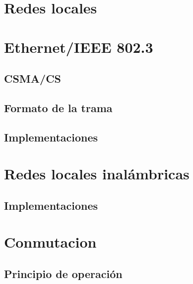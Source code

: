 \documentclass[
]{book}
\begin{document}
\hypertarget{redes-locales-1}{%
\section{Redes locales}\label{redes-locales-1}}

\hypertarget{ethernetieee-802.3}{%
\section{Ethernet/IEEE 802.3}\label{ethernetieee-802.3}}

\hypertarget{csmacs}{%
\subsection{CSMA/CS}\label{csmacs}}

\hypertarget{formato-de-la-trama}{%
\subsection{Formato de la trama}\label{formato-de-la-trama}}

\hypertarget{implementaciones}{%
\subsection{Implementaciones}\label{implementaciones}}

\hypertarget{redes-locales-inaluxe1mbricas}{%
\section{Redes locales inalámbricas}\label{redes-locales-inaluxe1mbricas}}

\hypertarget{implementaciones-1}{%
\subsection{Implementaciones}\label{implementaciones-1}}

\hypertarget{conmutacion}{%
\section{Conmutacion}\label{conmutacion}}

\hypertarget{principio-de-operaciuxf3n}{%
\subsection{Principio de operación}\label{principio-de-operaciuxf3n}}
\end{document}

